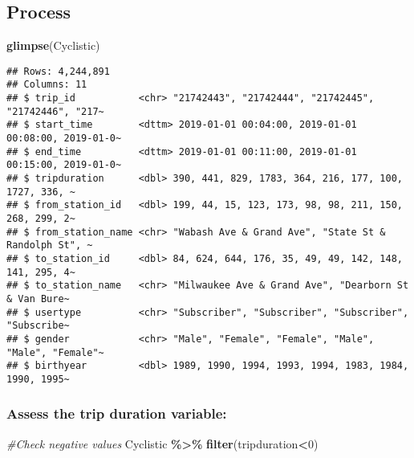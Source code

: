 \documentclass[
]{article}
\newenvironment{Shaded}{\begin{snugshade}}{\end{snugshade}}
\newcommand{\CommentTok}[1]{\textcolor[rgb]{0.56,0.35,0.01}{\textit{#1}}}
\newcommand{\DecValTok}[1]{\textcolor[rgb]{0.00,0.00,0.81}{#1}}
\newcommand{\FunctionTok}[1]{\textcolor[rgb]{0.13,0.29,0.53}{\textbf{#1}}}
\newcommand{\NormalTok}[1]{#1}
\newcommand{\SpecialCharTok}[1]{\textcolor[rgb]{0.81,0.36,0.00}{\textbf{#1}}}
\begin{document}
\hypertarget{process}{%
\subsection{Process}\label{process}}

\begin{Shaded}
\begin{Highlighting}[]
\FunctionTok{glimpse}\NormalTok{(Cyclistic)}
\end{Highlighting}
\end{Shaded}

\begin{verbatim}
## Rows: 4,244,891
## Columns: 11
## $ trip_id           <chr> "21742443", "21742444", "21742445", "21742446", "217~
## $ start_time        <dttm> 2019-01-01 00:04:00, 2019-01-01 00:08:00, 2019-01-0~
## $ end_time          <dttm> 2019-01-01 00:11:00, 2019-01-01 00:15:00, 2019-01-0~
## $ tripduration      <dbl> 390, 441, 829, 1783, 364, 216, 177, 100, 1727, 336, ~
## $ from_station_id   <dbl> 199, 44, 15, 123, 173, 98, 98, 211, 150, 268, 299, 2~
## $ from_station_name <chr> "Wabash Ave & Grand Ave", "State St & Randolph St", ~
## $ to_station_id     <dbl> 84, 624, 644, 176, 35, 49, 49, 142, 148, 141, 295, 4~
## $ to_station_name   <chr> "Milwaukee Ave & Grand Ave", "Dearborn St & Van Bure~
## $ usertype          <chr> "Subscriber", "Subscriber", "Subscriber", "Subscribe~
## $ gender            <chr> "Male", "Female", "Female", "Male", "Male", "Female"~
## $ birthyear         <dbl> 1989, 1990, 1994, 1993, 1994, 1983, 1984, 1990, 1995~
\end{verbatim}

\hypertarget{assess-the-trip-duration-variable}{%
\subsubsection{Assess the trip duration
variable:}\label{assess-the-trip-duration-variable}}

\begin{Shaded}
\begin{Highlighting}[]
\CommentTok{\#Check negative values}
\NormalTok{Cyclistic }\SpecialCharTok{\%\textgreater{}\%}
  \FunctionTok{filter}\NormalTok{(tripduration}\SpecialCharTok{\textless{}}\DecValTok{0}\NormalTok{)}
\end{Highlighting}
\end{Shaded}
\end{document}
